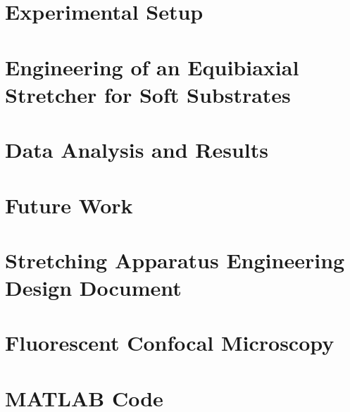 \documentclass[12pt, oneside]{book}
\begin{document}
\chapter{Experimental Setup}


\chapter{Engineering of an Equibiaxial Stretcher for Soft Substrates}


\chapter{Data Analysis and Results}


\chapter{Future Work}


\appendix 
\chapter{Stretching Apparatus Engineering Design Document}


\chapter{Fluorescent Confocal Microscopy}


\chapter{MATLAB Code}


%




\end{document}
